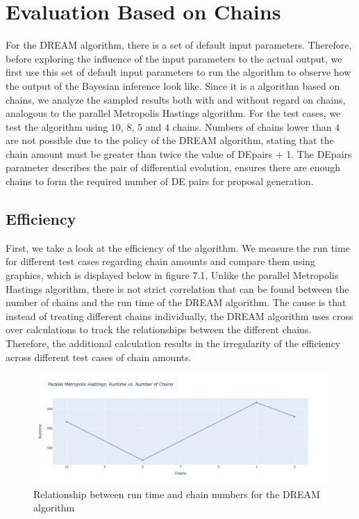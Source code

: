 \section{Evaluation Based on Chains}
For the DREAM algorithm, there is a set of default input parameters. Therefore, before exploring the influence of the input parameters to the actual output, we first use this set of default input parameters to run the algorithm to observe how the output of the Bayesian inference look like. Since it is a algorithm based on chains, we analyze the sampled results both with and without regard on chains, analogous to the parallel Metropolis Hastings algorithm. For the test cases, we test the algorithm using $10$, $8$, $5$ and $4$ chains. Numbers of chains lower than $4$ are not possible due to the policy of the DREAM algorithm, stating that the chain amount must be greater than twice the value of DEpairs + 1. The DEpairs parameter describes the pair of differential evolution, ensures there are enough chains to form the required number of DE pairs for proposal generation.


\subsection{Efficiency}
First, we take a look at the efficiency of the algorithm. We measure the run time for different test cases regarding chain amounts and compare them using graphics, which is displayed below in figure 7.1. Unlike the parallel Metropolis Hastings algorithm, there is not strict correlation that can be found between the number of chains and the run time of the DREAM algorithm. The cause is that instead of treating different chains individually, the DREAM algorithm uses cross over calculations to track the relationships between the different chains. Therefore, the additional calculation results in the irregularity of the efficiency across different test cases of chain amounts.

\begin{figure}[H]
    \centering
    \includegraphics[width=1\textwidth]{figures/dream/runtime.png}
    \captionsetup{width=.8\textwidth}
    \caption{Relationship between run time and chain numbers for the DREAM algorithm}
    \label{fig:enter-label}
\end{figure}
